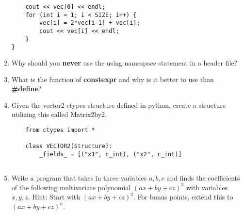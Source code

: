 \documentclass[12pt,letterpaper]{article}
\begin{document}
\begin{enumerate}
\begin{lstlisting}
    cout << vec[0] << endl;
    for (int i = 1; i < SIZE; i++) {
        vec[i] = 2*vec[i-1] + vec[i];
        cout << vec[i] << endl;
    }
}

    \end{lstlisting}
    
    \item Why should you \textbf{never} use the using namespace statement in a header file?
    
    \vspace{20mm}
    
    \item What is the function of \textbf{constexpr} and why is it better to use than \textbf{\#define}?
    
    \vspace{20mm}
    
    \item Given the vector2 ctypes structure defined in python, create a structure utilizing this called Matrix2by2.
    
    \lstset{language=python}
    \begin{lstlisting}
    from ctypes import *

    class VECTOR2(Structure):
        _fields_ = [("x1", c_int), ("x2", c_int)]
        
    \end{lstlisting}
    
    \vspace{20mm}
    
    \item Write a program that takes in three variables $a,b,c$ and finds the coefficients of the following multivariate polynomial $(ax + by + cz)^3$ with variables $x, y, z$.  Hint: Start with 
    $(ax+by+cz)^2$.  For bonus points, extend this to $(ax+by+cz)^n$.
    
\end{enumerate}
\end{document}
